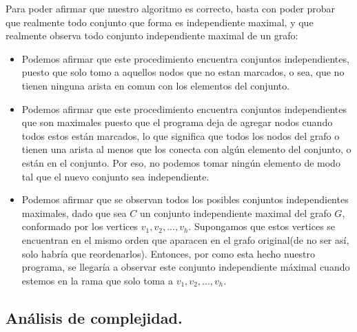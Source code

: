 Para poder afirmar que nuestro algoritmo es correcto, basta con poder probar que realmente todo conjunto que forma es independiente maximal, y que realmente observa todo conjunto independiente maximal de un grafo:
\begin{itemize}
	\item Podemos afirmar que este procedimiento encuentra conjuntos independientes, puesto que solo tomo a aquellos nodos que no estan marcados, o sea, que no tienen ninguna arista en comun con los elementos del conjunto.
	\item Podemos afirmar que este procedimiento encuentra conjuntos independientes que son maximales puesto que el programa deja de agregar nodos cuando todos estos están marcados, lo que significa que todos los nodos del grafo o tienen una arista al menos que los conecta con algún elemento del conjunto, o están en el conjunto. Por eso, no podemos tomar ningún elemento de modo tal que el nuevo conjunto sea independiente.
	\item Podemos afirmar que se observan todos los posibles conjuntos independientes maximales, dado que sea $C$ un conjunto independiente maximal del grafo $G$, conformado por los vertices $v_{1}, v_{2}, ... , v_{h}$. Supongamos que estos vertices se encuentran en el mismo orden que aparacen en el grafo original(de no ser así, solo habría que reordenarlos). Entonces, por como esta hecho nuestro programa, se llegaría a observar este conjunto independiente máximal cuando estemos en la rama que solo toma a $v_{1}, v_{2}, ... , v_{h}$.

\end{itemize}
	
\vspace*{0.6cm}


\subsection{Análisis de complejidad.}

\vspace*{0.3cm}

